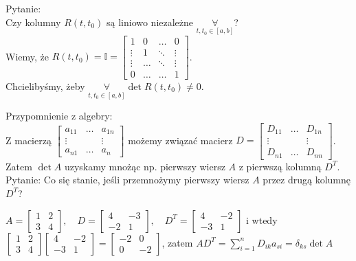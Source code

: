 \documentclass[../main.tex]{subfiles}
\begin{document}
Pytanie:\\
Czy kolumny $R(t,t_0)$ są liniowo niezależne $\underset{t,t_0\in [a,b]}{\forall} $?\\
Wiemy, że $R(t,t_0) = \mathbb{I} = \begin{bmatrix} 1&0&\ldots&0\\ \vdots&1&\ddots&\vdots \\ \vdots&\dots&\ddots&\vdots \\ 0&\dots&\dots&1 \end{bmatrix} $.\\
Chcielibyśmy, żeby $\underset{t,t_0\in[a,b] }{\forall} \det R(t,t_0) \neq 0$.

Przypomnienie z algebry:\\
Z macierzą $\begin{bmatrix} a_{11}&\ldots&a_{1n}\\ \vdots & & \vdots \\a_{n1} &\dots& a_{n} \end{bmatrix} $ możemy związać macierz $D = \begin{bmatrix} D_{11}&\ldots&D_{1n}\\ \vdots &&\vdots \\ D_{n1} & \ldots & D_{nn} \end{bmatrix} $.\\
Zatem $\det A$ uzyskamy mnożąc np. pierwszy wiersz $A$ z pierwszą kolumną $D^T$.\\
Pytanie: Co się stanie, jeśli przemnożymy pierwszy wiersz $A$ przez drugą kolumnę $D^T$?
\begin{przyklad}
    $A = \begin{bmatrix} 1&2\\3&4 \end{bmatrix},\quad D = \begin{bmatrix} 4&-3\\ -2&1 \end{bmatrix},\quad D^T = \begin{bmatrix} 4&-2\\-3&1 \end{bmatrix} $ i wtedy $\begin{bmatrix} 1&2\\3&4 \end{bmatrix} \begin{bmatrix} 4&-2\\-3&1 \end{bmatrix} = \begin{bmatrix} -2&0\\0&-2 \end{bmatrix} $, zatem $AD^T = \sum_{i=1}^n D_{ik}a_{si} = \delta_{ks}\det A$
\end{przyklad}
\end{document}
